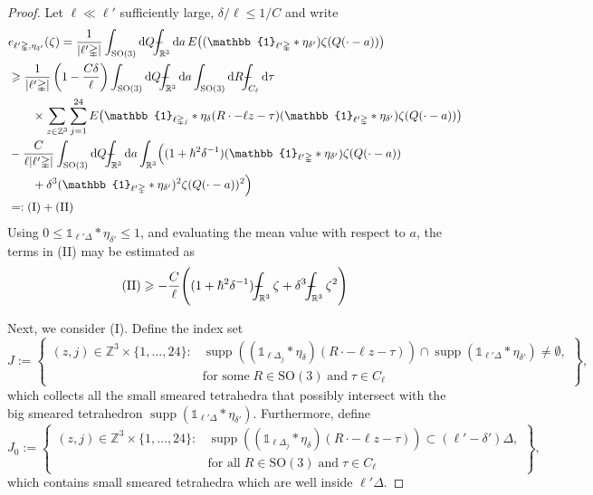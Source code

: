 \documentclass[final,onefignum,onetabnum,reqno]{amsart}
\theoremstyle{remark}
\renewcommand{\le}{\leqslant}
\renewcommand{\ge}{\geqslant}
\DeclareMathOperator{\supp}{supp}
\newcommand{\RR}{\mathbb{R}}
\newcommand{\ZZ}{\mathbb{Z}}
\newcommand{\SO}{\mathrm{SO}}
\newcommand{\iden}{\mathbb{1}} %
\newcommand{\tetra}{\mathbb{\Delta}} %
\newcommand{\dd}{\mathrm{d}} %
\def\Xint#1{\mathchoice
{\XXint\displaystyle\textstyle{#1}}%
{\XXint\textstyle\scriptstyle{#1}}%
{\XXint\scriptstyle\scriptscriptstyle{#1}}%
{\XXint\scriptscriptstyle\scriptscriptstyle{#1}}%
\!\int}
\def\XXint#1#2#3{{\setbox0=\hbox{$#1{#2#3}{\int}$ }
\vcenter{\hbox{$#2#3$ }}\kern-.6\wd0}}
\def\dashint{\Xint-}
\begin{document}
\begin{proof}
Let $\ell\ll \ell'$ sufficiently large, $\delta/\ell\le 1/C$ and write 
\begin{align*}
&e_{\ell'\tetra,\eta_{\delta'}}(\zeta)=\frac{1}{|\ell'\tetra|}\int_{\SO(3)}\dd Q \dashint_{\RR^3}\dd a \, E\bigl((\iden_{\ell'\tetra}*\eta_{\delta'})\zeta(Q(\cdot-a))\bigr)\\
&\ge \frac{1}{|\ell'\tetra|} \left(1-\frac{C\delta}{\ell}\right) \int_{\SO(3)}\dd Q \dashint_{\RR^3} \dd a  \int_{\SO(3)}\dd R  \dashint_{C_{\ell}}\dd\tau  \\
&\quad\quad\times \sum_{z\in\ZZ^3} \sum_{j=1}^{24} E\bigl(\iden_{\ell\tetra_j}*\eta_\delta(R\cdot - \ell z - \tau)(\iden_{\ell'\tetra}*\eta_{\delta'})\zeta(Q(\cdot -a))\bigr)\\
&-\frac{C}{\ell|\ell'\tetra|} \int_{\SO(3)}\dd Q \dashint_{\RR^3}\dd a \int_{\RR^3} \Bigl( (1+\hbar^2\delta^{-1})(\iden_{\ell'\tetra}*\eta_{\delta'}) \zeta(Q(\cdot-a)) \\
&\quad\quad+ \delta^3(\iden_{\ell'\tetra}*\eta_{\delta'})^2\zeta(Q(\cdot-a))^2 \Bigr)\\
&=:\mathrm{(I)} + \mathrm{(II)}
\end{align*}
Using $0\le \iden_{\ell'\tetra}*\eta_{\delta'}\le 1$, and evaluating the mean value with respect to $a$, the terms in (II) may be estimated as
\begin{align*}
\mathrm{(II)}\ge -\frac{C}{\ell}\Bigg( (1+\hbar^2\delta^{-1}) \dashint_{\RR^3} \zeta + \delta^3\dashint_{\RR^3} \zeta^2 \Bigg) 
\end{align*}

Next, we consider (I). Define the index set
$$
J:=\left\{ \begin{aligned}(z,j)\in \ZZ^3\times\{1,\ldots,24\} : &\supp( (\iden_{\ell\tetra_j}*\eta_\delta)(R\cdot - \ell z - \tau)) \cap \supp(\iden_{\ell'\tetra}*\eta_{\delta'})\neq \emptyset,\\
&\text{for some}\;R\in\SO(3)\;\text{and}\; \tau\in C_\ell \end{aligned} \right\},
$$
which collects all the small smeared tetrahedra that possibly intersect with the big smeared tetrahedron $\supp(\iden_{\ell'\tetra}*\eta_{\delta'})$. Furthermore, define
$$
J_0:=\left\{ \begin{aligned}(z,j)\in \ZZ^3\times\{1,\ldots,24\} : &\supp( (\iden_{\ell\tetra_j}*\eta_\delta)(R\cdot - \ell z - \tau)) \subset (\ell'-\delta')\tetra,\\
&\text{for all}\;R\in\SO(3)\;\text{and}\; \tau\in C_\ell \end{aligned} \right\},
$$
which contains small smeared tetrahedra which are well inside $\ell'\tetra$. 



\end{proof}
\end{document}
